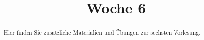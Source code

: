 \documentclass{ximera}
\title{Woche 6}
\begin{document}
\begin{abstract}
Hier finden Sie zusätzliche Materialien und Übungen zur sechsten Vorlesung.
\end{abstract}
\maketitle
\end{document}
